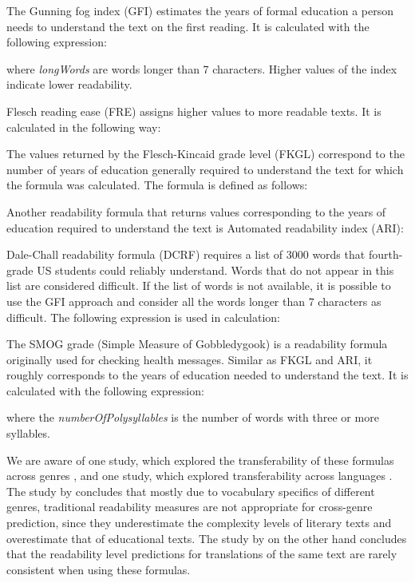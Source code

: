 \documentclass{clv3}
\begin{document}
The Gunning fog index \citep{gunning1952technique} (GFI) estimates the years of formal education a person needs to understand the text on the first reading. It is calculated with the following expression:

 where \textit{longWords} are words longer than 7 characters. Higher values of the index indicate lower readability. 

Flesch reading ease \citep{kincaid1975derivation} (FRE) assigns higher values to more readable texts. It is calculated in the following way:



The values returned by the Flesch-Kincaid grade level \citep{kincaid1975derivation} (FKGL) correspond to the number of years of education generally required to understand the text for which the formula was calculated. The formula is defined as follows:



Another readability formula that returns values corresponding to the years of education required to understand the text is Automated readability index \citep{smith1967automated} (ARI): 



Dale-Chall readability formula \citep{dale1948formula} (DCRF) requires a list of \num{3000} words that fourth-grade US students could reliably understand. Words that do not appear in this list are considered difficult. If the list of words is not available, it is possible to use the GFI approach and consider all the words longer than 7 characters as difficult. The following expression is used in calculation:  



The SMOG grade (Simple Measure of Gobbledygook) \cite{mc1969smog} is a readability formula originally used for checking health messages. Similar as FKGL and ARI, it roughly corresponds to the years of education needed to understand the text. It is calculated with the following expression: 

 where the \textit{numberOfPolysyllables} is the number of words with three or more syllables.

We are aware of one study, which explored the transferability of these formulas across genres \citep{sheehan2013two}, and one study, which explored transferability across languages \citep{madrazo2020cross}. The study by \citet{sheehan2013two} concludes that mostly due to vocabulary specifics of different genres, traditional readability measures are not appropriate for cross-genre prediction, since they underestimate the complexity levels of literary texts and overestimate that of educational texts. The study by \citet{madrazo2020cross} on the other hand concludes that the readability level predictions for translations of the same text are rarely consistent when using these formulas. 
\end{document}
